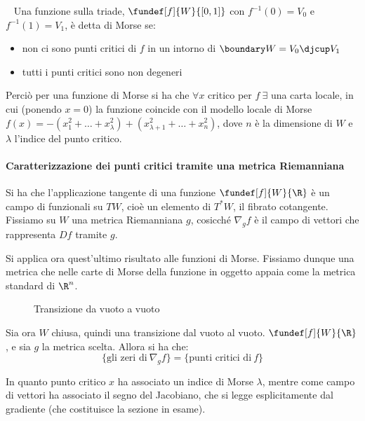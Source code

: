 \begin{defn}
~
Una funzione sulla triade, $\fundef[f]{W}{[0,1]}$ con $f^{-1}(0)=V_0$ e $f^{-1}(1)=V_1$, è detta di Morse se:
\begin{itemize}
\item non ci sono punti critici di $f$ in un intorno di $\boundary W = V_0\djcup V_1$
\item tutti i punti critici sono non degeneri
\end{itemize}
\end{defn}

Perciò per una funzione di Morse si ha che $\forall x$ critico per $f~\exists$ una carta locale, in cui (ponendo \wlg $x=0$) la funzione coincide con il modello locale di Morse $f(x) = -(x_1^2 + \dots + x_{\lambda}^2) + (x_{\lambda+1}^2 + \dots + x_n^2)$, dove $n$ è la dimensione di $W$ e $\lambda$ l'indice del punto critico.


\paragraph{Caratterizzazione dei punti critici tramite una metrica Riemanniana}Si ha che l'applicazione tangente di una funzione $\fundef[f]{W}{\R}$ è un campo di funzionali su $TW$, cioè un elemento di $T^{*}W$, il fibrato cotangente.
Fissiamo su $W$ una metrica Riemanniana $g$, cosicché $\nabla _g f$ è il campo di vettori che rappresenta $Df$ tramite $g$.

Si applica ora quest'ultimo risultato alle funzioni di Morse. Fissiamo dunque una metrica che nelle carte di Morse della funzione in oggetto appaia come la metrica standard di $\R^n$.

\begin{figure}[h]
\centering

\caption{Transizione da vuoto a vuoto}
\end{figure}

Sia ora $W$ chiusa, quindi una transizione dal vuoto al vuoto. $\fundef[f]{W}{\R}$, e sia $g$ la metrica scelta. Allora si ha che:
\begin{equation*}
\{\text{gli zeri di}~\nabla_g f\} = \{\text{punti critici di}~f\}
\end{equation*}

In quanto punto critico $x$ ha associato un indice di Morse $\lambda$, mentre come campo di vettori ha associato il segno del Jacobiano, che si legge esplicitamente dal gradiente (che costituisce la sezione in esame).

